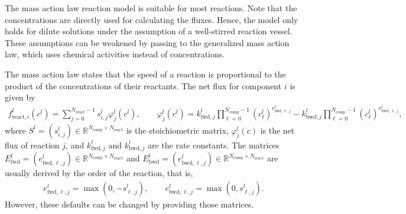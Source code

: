 The mass action law  reaction model is suitable for most reactions.
Note that the concentrations are directly used for calculating the fluxes.
Hence, the model only holds for dilute solutions under the assumption of a well-stirred reaction vessel.
These assumptions can be weakened by passing to the generalized mass action law, which uses chemical activities instead of concentrations.

The mass action law states that the speed of a reaction is proportional to the product of the concentrations of their reactants.
The net flux for component $i$ is given by
\begin{align*}
  f_{\text{react},i}^l\left(c^l\right) = \sum_{j=0}^{N_{\text{react}}-1} s_{i,j}^l \varphi^l_j\left(c^l\right), \qquad \varphi^l_j(c^l) = k^l_{\text{fwd},j} \prod_{\ell=0}^{N_{\text{comp}}-1} \left(c^l_{\ell}\right)^{e^l_{\text{fwd},\ell,j}} - k^l_{\text{bwd},j} \prod_{\ell=0}^{N_{\text{comp}}-1} \left(c^l_{\ell}\right)^{e^l_{\text{bwd},\ell,j}},
\end{align*}
where $S^l = (s^l_{i,j}) \in \mathds{R}^{N_{\text{comp}} \times N_{\text{react}}}$ is the stoichiometric matrix, $\varphi^l_j(c)$ is the net flux of reaction $j$, and $k^l_{\text{fwd},j}$ and $k^l_{\text{bwd},j}$ are the rate constants.
The matrices $E^l_{\text{fwd}} = (e^l_{\text{fwd},\ell,j}) \in \mathds{R}^{N_{\text{comp}} \times N_{\text{react}}}$ and $E^l_{\text{bwd}} = (e^l_{\text{bwd},\ell,j}) \in \mathds{R}^{N_{\text{comp}} \times N_{\text{react}}}$ are usually derived by the order of the reaction, that is,
\begin{align}
	e^l_{\text{fwd},\ell,j} = \max(0, -s^l_{\ell,j}), \qquad e^l_{\text{bwd},\ell,j} = \max(0, s^l_{\ell,j}). \label{eq:MRMassActionLawExpMatDefault}
\end{align}
However, these defaults can be changed by providing those matrices.

